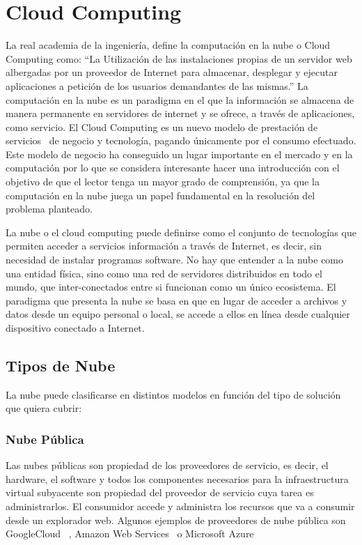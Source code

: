 \documentclass[a4paper,11pt]{book}
\begin{document}
\section{Cloud Computing}

La real academia de la ingeniería, define la computación en la nube o Cloud Computing\citep{realacademia}  como: “La Utilización de las instalaciones propias de un servidor web albergadas por un proveedor de Internet para almacenar, desplegar y ejecutar aplicaciones a petición de los usuarios demandantes de las mismas.” La computación en la nube es un paradigma en el que la información se almacena de manera permanente en servidores de internet y se ofrece, a través de aplicaciones, como servicio. El Cloud Computing es un nuevo modelo de prestación de servicios~\cite{magazine} de negocio y tecnología, pagando únicamente por el consumo efectuado. Este modelo de negocio ha conseguido un lugar importante en el mercado y en la computación  por lo que se considera  interesante hacer una introducción con el objetivo de que el lector tenga un mayor grado de comprensión, ya que la computación en la nube juega un papel fundamental en la resolución  del problema planteado.

La nube  o el cloud computing  puede definirse  como el conjunto de tecnologías que permiten acceder a servicios información a través de Internet, es decir, sin necesidad de instalar programas software. No hay que entender a la nube como una entidad física, sino como una red de servidores distribuidos en todo el mundo, que inter-conectados entre si funcionan como un único ecosistema.  El paradigma que presenta la nube se basa en que en lugar de acceder a archivos y datos desde un equipo personal o local, se accede a ellos en línea desde cualquier dispositivo conectado a Internet. 

\subsection{Tipos de Nube}

La nube puede clasificarse en distintos modelos en función del tipo de solución que quiera cubrir:

\subsubsection{Nube Pública}

Las nubes públicas son propiedad de los proveedores de servicio, es decir, el hardware, el software y todos los componentes necesarios para la infraestructura virtual subyacente son propiedad del proveedor de servicio cuya tarea es administrarlos. El consumidor accede y administra los recursos que va a consumir desde un explorador web.  Algunos ejemplos de proveedores de nube pública son GoogleCloud~\cite{gcp} , Amazon Web Services~\cite{aws} o Microsoft Azure~\cite{azure}
\end{document}
